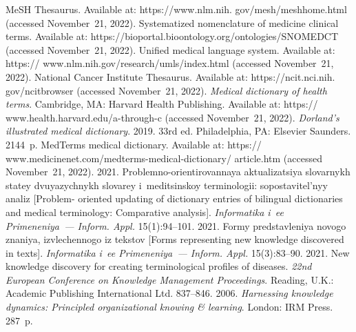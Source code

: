   \begin{multicols}{2}

\renewcommand{\bibname}{\protect\rmfamily References}

{\small\frenchspacing
 {%
 \begin{thebibliography}{99}
MeSH Thesaurus. Available at: {\sf https://www.nlm.nih. gov/mesh/meshhome.html} (accessed 
November~21, 2022). 
Systematized nomenclature of medicine clinical terms. Available at: {\sf 
https://bioportal.bioontology.\linebreak org/ontologies/SNOMEDCT} (accessed November~21, 2022).
Unified medical language system. Available at: {\sf https:// www.nlm.nih.gov/research/umls/index.html} 
(accessed November~21, 2022).
National Cancer Institute Thesaurus. Available at: {\sf https://ncit.nci.nih. gov/ncitbrowser} (accessed November~21, 2022).
\textit{Medical dictionary of health terms}. Cambridge, MA: Harvard Health Publishing. Available at: {\sf  
https:// www.health.harvard.edu/a-through-c} (accessed November~21, 2022).
\textit{Dorland's illustrated medical dictionary}. 2019. 33rd ed. Philadelphia, PA: Elsevier Saunders. 
2144~p.
{MedTerms medical dictionary}. Available at: {\sf  
https:// www.medicinenet.com/medterms-medical-dictionary/ article.htm} (accessed November~21, 2022).
 2021. Problemno-orientirovannaya ak\-tu\-a\-li\-za\-tsiya slovarnykh statey dvuyazychnykh 
slovarey i~me\-di\-tsin\-skoy terminologii: sopostavitel'nyy analiz [Problem- oriented updating of dictionary 
entries of bilingual \mbox{dictionaries} and medical terminology: Comparative analysis]. \textit{Informatika i~ee 
Primeneniya~--- Inform. Appl.} 15(1):94--101.
 2021. Formy predstavleniya novogo znaniya, izvlechennogo iz tekstov [Forms 
representing new knowledge discovered in texts]. \textit{Informatika i~ee Primeneniya~--- Inform. Appl.} 
15(3):83--90.
 2021. New knowledge discovery for creating terminological 
profiles of diseases. \textit{22nd European Conference on Knowledge Management Proceedings}. 
Reading, U.K.: Academic Publishing International Ltd. 837--846.
 2006. \textit{Harnessing knowledge dynamics: Principled organizational knowing 
\& learning}. London: IRM Press. 287~p.

\end{thebibliography}}}
\end{multicols}

